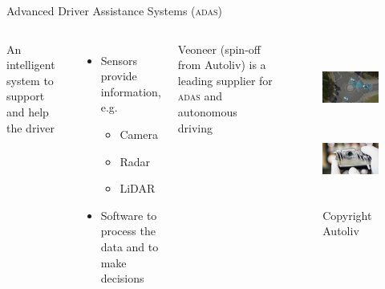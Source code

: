 \documentclass{beamer}
\newcommand{\adas}{\textsc{adas}\xspace}
\newcommand{\eg}{e.g.\xspace}
\begin{document}
\begin{frame}{Advanced Driver Assistance Systems (\adas)}
	\begin{columns}
	An intelligent system to support and help the driver
	\begin{itemize}
		\item Sensors provide information, \eg
		\begin{itemize}
			\item Camera
			\item Radar
			\item LiDAR
		\end{itemize}
		\item Software to process the data and to make decisions
	\end{itemize}
	Veoneer (spin-off from Autoliv) is a leading supplier for \adas and autonomous driving
		\begin{figure}
			\includegraphics[height=2.25cm]{fig/ALV_Radar-Detection}
			\includegraphics[height=2.25cm]{fig/ALV_Mono-Vision-Sensor}
			\caption{Copyright Autoliv}
		\end{figure}
	\end{columns}
\end{frame}
\end{document}
